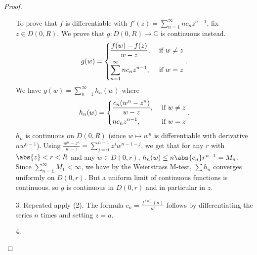 \begin{proof}
\begin{enumerate}
        To prove that \(f\) is differentiable with \(f'(z)=\sum\limits_{n=1}^{\infty} nc_n z^{n-1}\), fix \(z \in D(0,R)\). We prove that \(g: D(0,R) \to \mathbb{C}\) is continuous instead.
        \[
            g(w) = \begin{dcases}
                \frac{f(w) - f(z)}{w - z}, &\text{ if } w\neq  z\\
                \sum\limits_{n=1}^{\infty} nc_n z^{n-1}, &\text{ if } w = z
            \end{dcases}.
        \]
        We have \(g(w) = \sum\limits_{n=1}^{\infty} h_n(w)\) where
        \[
            h_n(w) = \begin{dcases}
                \frac{c_n(w^n - z^n)}{w - z}, &\text{ if } w\neq z\\
                nc_n z^{n-1}, &\text{ if } w = z\\
            \end{dcases}.
        \]
        \(h_n\) is continuous on \(D(0,R)\) (since \(w \mapsto w^n\) is differentiable with derivative \(nw^{n-1}\)). Using \(\frac{w^n - z^n}{w-z}=\sum\limits_{j=0}^{n-1}z^j w^{n-1-j}\), we get that for any \(r\) with \(\abs{z} < r<R\) and any \(w \in D(0,r)\), \(h_n(w) \leq n\abs{c_n} r^{n-1} = M_n\). Since \(\sum\limits_{n=1}^{\infty} M_1<\infty\), we have by the Weierstrass M-test, \(\sum h_n\) converges uniformly on \(D(0,r)\). But a uniform limit of continuous functions is continuous, so \(g\) is continuous in \(D(0,r)\) and in particular in \(z\).
        \item[3.] Repeated apply (2). The formula \(c_n = \frac{f^(n)(a)}{n!}\) follows by differentiating the series \(n\) times and setting \(z = a\).
        \item[4.]
    \end{enumerate}
\end{proof}